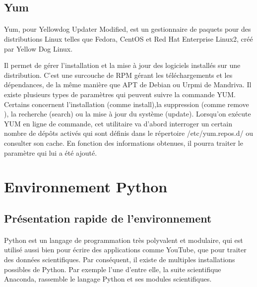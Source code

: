 \documentclass[a4paper,12pt]{article}
\begin{document}
\subsection{Yum}
\paragraph{}
Yum, pour Yellowdog Updater Modified, est un gestionnaire de paquets pour des distributions Linux telles que Fedora, CentOS et Red Hat Enterprise Linux2, créé par Yellow Dog Linux.

Il permet de gérer l'installation et la mise à jour des logiciels installés sur une distribution. C'est une surcouche de RPM gérant les téléchargements et les dépendances, de la même manière que APT de Debian ou Urpmi de Mandriva.
Il existe plusieurs types de paramètres qui peuvent suivre la commande YUM. Certains concernent l'installation (comme install),la suppression (comme remove ), la recherche (search) ou la mise à jour du système (update). Lorsqu'on exécute YUM 
en ligne de commande, cet utilitaire va d'abord interroger un certain nombre de dépôts activés qui sont définis dans le répertoire /etc/yum.repos.d/ ou consulter son cache. En fonction des informations obtenues, il pourra traiter le paramètre qui lui a été ajouté.

\clearpage
\section{Environnement Python}
\subsection{Présentation rapide de l'environnement}
\paragraph{}
Python est un langage de programmation très polyvalent et modulaire, qui est utilisé aussi bien pour écrire des applications comme YouTube, que pour traiter des données scientifiques. Par conséquent, il existe de multiples installations possibles de Python. Par exemple l'une d'entre elle, la suite scientifique Anaconda, rassemble le langage Python et ses modules scientifiques.
\end{document}
